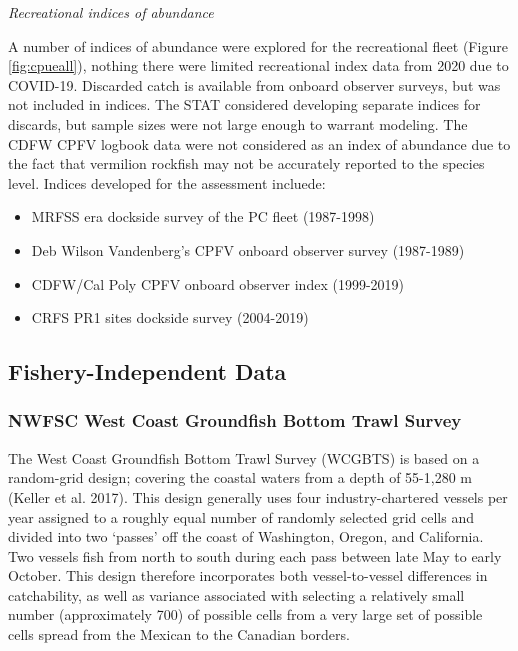 \documentclass[
  english,
  a4paper,
]{article}
\providecommand{\tightlist}{%
  \setlength{\itemsep}{0pt}\setlength{\parskip}{0pt}}
\begin{document}
\emph{Recreational indices of abundance}

A number of indices of abundance were explored for the recreational fleet (Figure \ref{fig:cpueall}), nothing there were limited recreational index data from 2020
due to COVID-19. Discarded catch is available from onboard observer surveys, but
was not included in indices. The STAT considered developing separate indices for
discards, but sample sizes were not large enough to warrant modeling. The CDFW
CPFV logbook data were not considered as an index of abundance due to the fact that
vermilion rockfish may not be accurately reported to the species level. Indices
developed for the assessment incluede:

\begin{itemize}
\tightlist
\item
  MRFSS era dockside survey of the PC fleet (1987-1998)
\item
  Deb Wilson Vandenberg's CPFV onboard observer survey (1987-1989)
\item
  CDFW/Cal Poly CPFV onboard observer index (1999-2019)
\item
  CRFS PR1 sites dockside survey (2004-2019)
\end{itemize}

\hypertarget{fishery-independent-data}{%
\subsection{Fishery-Independent Data}\label{fishery-independent-data}}

\hypertarget{nwfsc-west-coast-groundfish-bottom-trawl-survey}{%
\subsubsection{NWFSC West Coast Groundfish Bottom Trawl Survey}\label{nwfsc-west-coast-groundfish-bottom-trawl-survey}}

The West Coast Groundfish Bottom Trawl Survey (WCGBTS) is based on a random-grid design;
covering the coastal waters from a depth of 55-1,280 m (Keller et al. 2017).
This design generally uses four industry-chartered vessels per year assigned to
a roughly equal number of randomly selected grid cells and divided into two `passes'
off the coast of Washington, Oregon, and California. Two vessels fish from north to
south during each pass between late
May to early October. This design therefore incorporates both vessel-to-vessel
differences in catchability, as well as variance associated with selecting a
relatively small number (approximately 700) of possible cells from a very large
set of possible cells spread from the Mexican to the Canadian borders.
\end{document}
